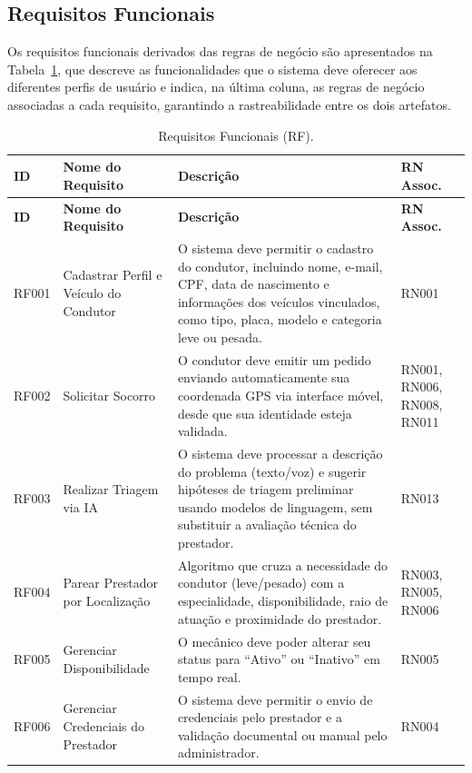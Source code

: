 \documentclass[12pt, a4paper]{article}
\begin{document}
\subsection{Requisitos Funcionais}

Os requisitos funcionais derivados das regras de negócio são apresentados na Tabela~\ref{tab:rf}, que descreve as funcionalidades que o sistema deve oferecer aos diferentes perfis de usuário e indica, na última coluna, as regras de negócio associadas a cada requisito, garantindo a rastreabilidade entre os dois artefatos.

{\footnotesize
\setlength{\tabcolsep}{3pt}
\renewcommand{\arraystretch}{1.15}
\begin{longtable}{|>{\raggedright\arraybackslash}p{}|>{\raggedright\arraybackslash}p{}|>{\raggedright\arraybackslash}p{}|>{\raggedright\arraybackslash}p{}|}
\caption{Requisitos Funcionais (RF).}
\label{tab:rf} \\
\hline
\textbf{ID} & \textbf{Nome do Requisito} & \textbf{Descrição} & \textbf{RN Assoc.} \\ \hline
\endfirsthead
\hline
\textbf{ID} & \textbf{Nome do Requisito} & \textbf{Descrição} & \textbf{RN Assoc.} \\ \hline
\endhead
RF001 & Cadastrar Perfil e Veículo do Condutor & O sistema deve permitir o cadastro do condutor, incluindo nome, e-mail, CPF, data de nascimento e informações dos veículos vinculados, como tipo, placa, modelo e categoria leve ou pesada. & RN001 \\ \hline
RF002 & Solicitar Socorro & O condutor deve emitir um pedido enviando automaticamente sua coordenada GPS via interface móvel, desde que sua identidade esteja validada. & RN001, RN006, RN008, RN011 \\ \hline
RF003 & Realizar Triagem via IA & O sistema deve processar a descrição do problema (texto/voz) e sugerir hipóteses de triagem preliminar usando modelos de linguagem, sem substituir a avaliação técnica do prestador. & RN013 \\ \hline
RF004 & Parear Prestador por Localização & Algoritmo que cruza a necessidade do condutor (leve/pesado) com a especialidade, disponibilidade, raio de atuação e proximidade do prestador. & RN003, RN005, RN006 \\ \hline
RF005 & Gerenciar Disponibilidade & O mecânico deve poder alterar seu status para ``Ativo'' ou ``Inativo'' em tempo real. & RN005 \\ \hline
RF006 & Gerenciar Credenciais do Prestador & O sistema deve permitir o envio de credenciais pelo prestador e a validação documental ou manual pelo administrador. & RN004 \\ \hline

\end{longtable}}
\end{document}
